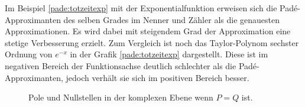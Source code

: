 Im Beispiel \ref{pade:totzeitexp} mit der Exponentialfunktion erweisen sich die Padé-Approximanten des selben Grades im Nenner und Zähler als die genauesten Approximationen.
Es wird dabei mit steigendem Grad der Approximation eine stetige Verbesserung erzielt.
Zum Vergleich ist noch das Taylor-Polynom sechster Ordnung von $e^{-x}$
in der Grafik \ref{pade:totzeitexp} dargestellt. 
Diese ist im negativen Bereich der Funktionsachse deutlich schlechter als die Padé-Approximanten, jedoch verhält sie sich im positiven Bereich besser.

\begin{figure}
\centering
{}
\caption{Pole und Nullstellen in der komplexen Ebene wenn $P=Q$ ist.
\label{pade:poles1}}
\end{figure}
%
